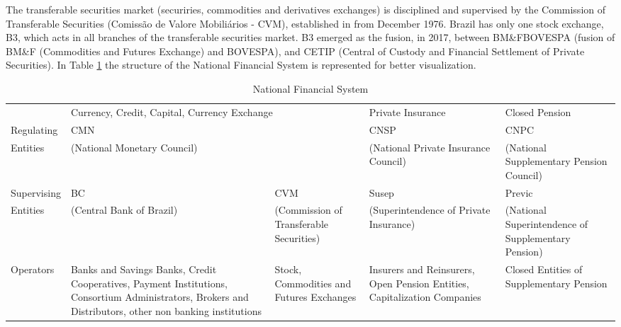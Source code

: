 \documentclass[cic,tc, english]{iiufrgs}
\begin{document}
    The transferable securities market (securiries, commodities and derivatives exchanges) is disciplined and supervised by the Commission of Transferable Securities (Comissão de Valore Mobiliários - CVM), established in \citet{lei6385} from December 1976. Brazil has only one stock exchange, B3, which acts in all branches of the transferable securities market. B3 emerged as the fusion, in 2017, between BM\&FBOVESPA (fusion of BM\&F (Commodities and Futures Exchange) and BOVESPA), and CETIP (Central of Custody and Financial Settlement of Private Securities).  In Table \ref{tab:sistemanacional} the structure of the National Financial System is represented for better visualization.

    \begin{table}[H]
        \caption{National Financial System}
        \label{tab:sistemanacional}
        \centering
        \begin{tabular}{lp{2.3cm}|p{2.3cm}|p{2.3cm}|p{2.3cm}}
             & \multicolumn{2}{p{4.6cm}||}{Currency, Credit, Capital, Currency Exchange} & \multicolumn{1}{l||}{Private Insurance} & \multicolumn{1}{l}{Closed Pension} \\ \cline{2-5} 
            \multicolumn{1}{l|}{Regulating} & \multicolumn{2}{l||}{CMN} & \multicolumn{1}{p{2.3cm}||}{CNSP} & \multicolumn{1}{p{2.3cm}|}{CNPC} \\
            \multicolumn{1}{l|}{Entities} & \multicolumn{2}{l||}{(National Monetary Council)} & \multicolumn{1}{p{2.75cm}||}{(National Private Insurance Council)} & \multicolumn{1}{p{2.3cm}|}{(National Supplementary Pension Council)} \\ \hline
            \multicolumn{1}{l|}{Supervising} & \multicolumn{1}{p{2.3cm}||}{BC} & \multicolumn{1}{p{2.3cm}||}{CVM} & \multicolumn{1}{p{2.3cm}||}{Susep} & \multicolumn{1}{p{2.3cm}|}{Previc} \\
            \multicolumn{1}{l|}{Entities} & \multicolumn{1}{p{2.3cm}||}{(Central Bank of Brazil)} & \multicolumn{1}{p{2.3cm}||}{(Commission of Transferable Securities)} & \multicolumn{1}{p{2.75cm}||}{(Superintendence of Private Insurance)} & \multicolumn{1}{p{2.3cm}|}{(National Superintendence of Supplementary Pension)} \\ \hline
            \multicolumn{1}{l|}{Operators} & \multicolumn{1}{p{2.3cm}||}{Banks and Savings Banks,  Credit Cooperatives, Payment Institutions, Consortium Administrators, Brokers and Distributors, other non banking institutions} & \multicolumn{1}{p{2.3cm}||}{Stock, Commodities and Futures Exchanges} & \multicolumn{1}{p{2.75cm}||}{Insurers and Reinsurers, Open Pension Entities, Capitalization Companies} & \multicolumn{1}{p{2.3cm}|}{Closed Entities of Supplementary Pension} \\ \cline{2-5} 
        \end{tabular}
    \end{table}
\end{document}
